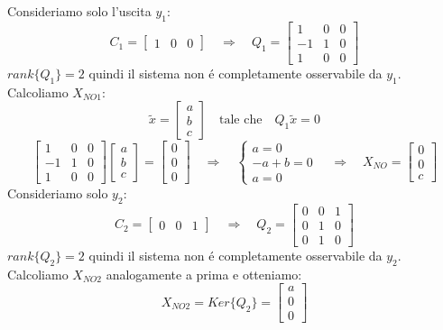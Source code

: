 \documentclass[../main.tex]{subfiles}
\begin{document}
\begin{mdframed}[style=Exercise]
\begin{Exercise}[title={Calcolare $ X_{NO} $}, difficulty=1]
				Consideriamo solo l'uscita $ y_1 $:
				\[
					C_1 =
					\begin{bmatrix}
						1 & 0 & 0
					\end{bmatrix}
					\quad\Rightarrow\quad
					Q_1 =
					\begin{bmatrix}
						1 & 0 & 0\\
						-1 & 1 & 0\\
						1 & 0 & 0
					\end{bmatrix}
				\] 
				$ rank\{Q_1\} = 2 $ quindi il sistema non \'e completamente osservabile da $ y_1 $. Calcoliamo $ X_{NO1} $:
				\[
					\tilde x =
					\begin{bmatrix}
						a\\
						b\\
						c
					\end{bmatrix}
					\quad\text{tale che}\quad
					Q_1 \tilde x = 0
				\]
				\[
					\begin{bmatrix}
						1 & 0 & 0\\
						-1 & 1 & 0\\
						1 & 0 & 0
					\end{bmatrix}
					\begin{bmatrix}
						a\\
						b\\
						c
					\end{bmatrix} =
					\begin{bmatrix}
						0\\
						0\\
						0
					\end{bmatrix}
					\quad\Rightarrow\quad
					\begin{cases}
						a = 0\\
						-a+b = 0\\
						a = 0
					\end{cases}
					\quad\Rightarrow\quad X_{NO} =
					\begin{bmatrix}
						0\\
						0\\
						c
					\end{bmatrix}
				\]
				Consideriamo solo $ y_2 $:
				\[
					C_2 =
					\begin{bmatrix}
						0 & 0 & 1
					\end{bmatrix}
					\quad\Rightarrow\quad
					Q_2 =
					\begin{bmatrix}
						0 & 0 & 1\\
						0 & 1 & 0\\
						0 & 1 & 0
					\end{bmatrix}
				\] 
				$ rank\{Q_2\} = 2 $ quindi il sistema non \'e completamente osservabile da $ y_2 $. Calcoliamo $ X_{NO2} $ analogamente a prima e otteniamo:
				\[
					X_{NO2} = Ker\{Q_2\} =
					\begin{bmatrix}
						a\\
						0\\
						0
					\end{bmatrix}
				\]
			\end{Exercise}
		\end{mdframed}
\end{document}
